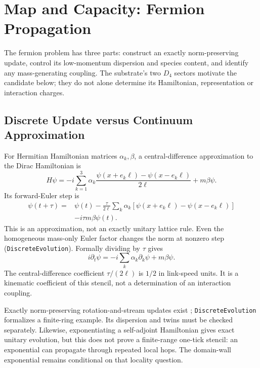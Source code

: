 \section{Map and Capacity: Fermion Propagation}
\label{sec:map_capacity}

The fermion problem has three parts: construct an exactly norm-preserving update, control its low-momentum dispersion and species content, and identify any mass-generating coupling. The substrate's two $D_4$ sectors motivate the candidate below; they do not alone determine its Hamiltonian, representation or interaction charges.

\subsection{Discrete Update versus Continuum Approximation}
\label{sec:unitary_flux_constraint}
For Hermitian Hamiltonian matrices $\alpha_k,\beta$, a central-difference approximation to the Dirac Hamiltonian is
\begin{equation}
 H\psi=-i\sum_{k=1}^3\alpha_k\frac{\psi(x+e_k\ell)-\psi(x-e_k\ell)}{2\ell}+m\beta\psi.
\end{equation}
Its forward-Euler step is
\begin{equation}
\begin{aligned}
 \psi(t+\tau)={}&\psi(t)-\frac{\tau}{2\ell}\sum_k\alpha_k
 [\psi(x+e_k\ell)-\psi(x-e_k\ell)]\\
 &-i\tau m\beta\psi(t).
\end{aligned}
\label{eq:unitary_flux}
\end{equation}
This is an approximation, not an exactly unitary lattice rule. Even the homogeneous mass-only Euler factor changes the norm at nonzero step (\nolinkurl{DiscreteEvolution}). Formally dividing by $\tau$ gives
\begin{equation}
 i\partial_t\psi=-i\sum_k\alpha_k\partial_k\psi+m\beta\psi.
\label{eq:diff_form}
\end{equation}
The central-difference coefficient $\tau/(2\ell)$ is $1/2$ in link-speed units. It is a kinematic coefficient of this stencil, not a determination of an interaction coupling.

Exactly norm-preserving rotation-and-stream updates exist \cite{meyer_quantum_1996,feynman_quantum_1965}; \nolinkurl{DiscreteEvolution} formalizes a finite-ring example. Its dispersion and twins must be checked separately. Likewise, exponentiating a self-adjoint Hamiltonian gives exact unitary evolution, but this does not prove a finite-range one-tick stencil: an exponential can propagate through repeated local hops. The domain-wall exponential remains conditional on that locality question.


